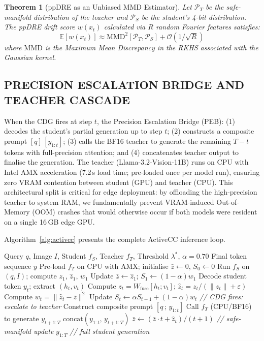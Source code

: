\documentclass{ieeetmlcn}
\newtheorem{theorem}{Theorem}
\begin{document}
 \begin{theorem}[ppDRE as an Unbiased MMD Estimator]
 \label{thm:mmd}
 Let $\mathcal{P}_T$ be the safe-manifold distribution of the teacher and $\mathcal{P}_S$ be the student's 4-bit distribution. The ppDRE drift score $w(x_t)$ calculated via $R$ random Fourier features satisfies:
 \begin{equation}
   \mathbb{E}[w(x_t)] \approx \text{MMD}^2[\mathcal{P}_T, \mathcal{P}_S] + \mathcal{O}(1/\sqrt{R})
 \end{equation}
 where $\text{MMD}$ is the Maximum Mean Discrepancy in the RKHS associated with the Gaussian kernel.
 \end{theorem}


\subsection{PRECISION ESCALATION BRIDGE AND TEACHER CASCADE}
When the CDG fires at step $t$, the Precision Escalation Bridge (PEB):
(1) decodes the student's partial generation up to step $t$; (2)
constructs a composite prompt $[q]\,[y_{1:t}]$; (3) calls the BF16
teacher to generate the remaining $T-t$ tokens with full-precision
attention; and (4) concatenates teacher output to finalise the
generation. The teacher (Llama-3.2-Vision-11B) runs on CPU with Intel
AMX acceleration (7.2\,s load time; pre-loaded once per model run),
ensuring zero VRAM contention between student (GPU) and teacher (CPU). This architectural split is critical for edge deployment: by offloading the high-precision teacher to system RAM, we fundamentally prevent VRAM-induced Out-of-Memory (OOM) crashes that would otherwise occur if both models were resident on a single 16\,GB edge GPU.

Algorithm~\ref{alg:activcc} presents the complete ActiveCC inference
loop.

\begin{algorithm}
\caption{ActiveCC Runtime Inference}
\label{alg:activcc}
\begin{algorithmic}[1]
\REQUIRE Query $q$, Image $I$, Student $f_S$, Teacher $f_T$,
         Threshold $\lambda^*$, $\alpha=0.70$
\ENSURE Final token sequence $y$
\STATE Pre-load $f_T$ on CPU with AMX; initialise $\bar{z}\leftarrow 0$,
       $S_0\leftarrow 0$
\STATE Run $f_S$ on $(q,I)$; compute $z_1$, $\hat{z}_1$, $w_1$
\STATE Update $\bar{z}\leftarrow\hat{z}_1$; $S_1\leftarrow(1-\alpha)w_1$
  \STATE Decode student token $y_t$; extract $(h_t, v_t)$
  \STATE Compute $z_t = W_{\text{fuse}}[h_t;v_t]$;
         $\hat{z}_t = z_t/(\|z_t\|+\varepsilon)$
  \STATE Compute $w_t = \|\hat{z}_t - \bar{z}\|^2$
  \STATE Update $S_t \leftarrow \alpha S_{t-1} + (1-\alpha)w_t$
    \STATE \textit{// CDG fires: escalate to teacher}
    \STATE Construct composite prompt $[q\,;\,y_{1:t}]$
    \STATE Call $f_T$ (CPU/BF16) to generate $y_{t+1:T}$
    \RETURN $\mathrm{concat}(y_{1:t},\, y_{t+1:T})$
  \ELSE
    \STATE $\bar{z} \leftarrow (\bar{z}\cdot t + \hat{z}_t)/(t+1)$
           \quad\textit{// safe-manifold update}
  \ENDIF
\ENDFOR
\RETURN $y_{1:T}$ \quad\textit{// full student generation}
\end{algorithmic}
\end{algorithm}
\end{document}
